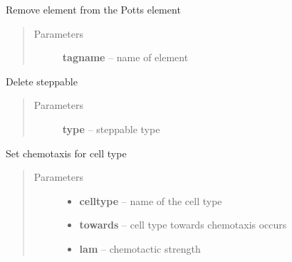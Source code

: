 \documentclass[letterpaper,10pt,english]{sphinxmanual}
\begin{document}
\begin{fulllineitems}
\begin{fulllineitems}
\label{Experiment:Experiment.Experiment.deletePottsProperty}
Remove element from the Potts element
\begin{quote}\begin{description}
\item[{Parameters}] \leavevmode
\textbf{tagname} -- name of element

\end{description}\end{quote}

\end{fulllineitems}


\begin{fulllineitems}
\label{Experiment:Experiment.Experiment.deleteSteppable}
Delete steppable
\begin{quote}\begin{description}
\item[{Parameters}] \leavevmode
\textbf{type} -- steppable type

\end{description}\end{quote}

\end{fulllineitems}


\begin{fulllineitems}
\label{Experiment:Experiment.Experiment.setChemotaxis}
Set chemotaxis for cell type
\begin{quote}\begin{description}
\item[{Parameters}] \leavevmode\begin{itemize}
\item {} 
\textbf{celltype} -- name of the cell type

\item {} 
\textbf{towards} -- cell type towards chemotaxis occurs

\item {} 
\textbf{lam} -- chemotactic strength

\end{itemize}


\end{description}
\end{quote}
\end{fulllineitems}
\end{fulllineitems}
\end{document}
